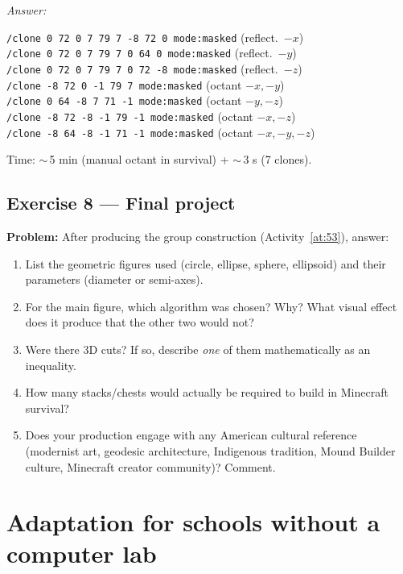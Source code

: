 \documentclass[12pt,a4paper]{scrartcl}
\newcommand{\cmd}[1]{\textcolor{earth}{\texttt{\small #1}}}
\begin{document}
\emph{Answer:}

\begin{minecraft}
\cmd{/clone 0 72 0 7 79 7 -8 72 0 mode:masked} \quad (reflect.\ $-x$)\\
\cmd{/clone 0 72 0 7 79 7 0 64 0 mode:masked} \quad\quad (reflect.\ $-y$)\\
\cmd{/clone 0 72 0 7 79 7 0 72 -8 mode:masked} \quad (reflect.\ $-z$)\\
\cmd{/clone -8 72 0 -1 79 7 mode:masked} \quad\quad\;\; (octant $-x,-y$)\\
\cmd{/clone 0 64 -8 7 71 -1 mode:masked} \quad\quad\;\; (octant $-y,-z$)\\
\cmd{/clone -8 72 -8 -1 79 -1 mode:masked} \quad\;\; (octant $-x,-z$)\\
\cmd{/clone -8 64 -8 -1 71 -1 mode:masked} \quad\;\; (octant $-x,-y,-z$)
\end{minecraft}

Time: $\sim$\,5 min (manual octant in survival) + $\sim$\,3 s (7 clones).

\subsection*{Exercise 8 --- Final project}
\textbf{Problem:} After producing the group construction (Activity~\ref{at:53}), answer:
\begin{enumerate}[label=(\arabic*),leftmargin=1.7em,itemsep=0.15em,topsep=0.2em,nosep]
  \item List the geometric figures used (circle, ellipse, sphere, ellipsoid) and their parameters (diameter or semi-axes).
  \item For the main figure, which algorithm was chosen? Why? What visual effect does it produce that the other two would not?
  \item Were there 3D cuts? If so, describe \emph{one} of them mathematically as an inequality.
  \item How many stacks/chests would actually be required to build in Minecraft survival?
  \item Does your production engage with any American cultural reference (modernist art, geodesic architecture, Indigenous tradition, Mound Builder culture, Minecraft creator community)? Comment.
\end{enumerate}

\newpage
\section{Adaptation for schools without a computer lab}\label{ap:adapt-analog}
\end{document}
